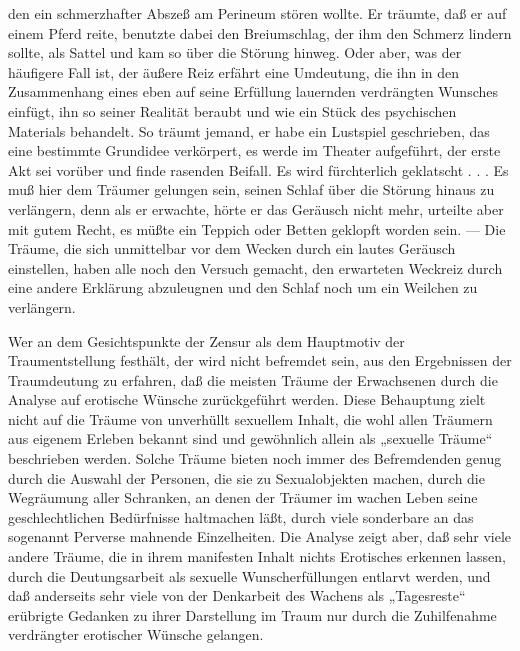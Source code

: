 \documentclass[twoside=true,titlepage=false,open=any, parskip=never, fontsize=10pt, headings=small, chapterprefix=false, appendixprefix=false]{scrbook}
\begin{document}
        \pstart
        den ein schmerzhafter Abszeß am Perineum stören wollte. Er träumte,
               daß er auf einem Pferd reite, benutzte dabei den Breiumschlag, der
               ihm den Schmerz lindern sollte, als Sattel und kam so über die Störung hinweg.
               Oder aber, was der häufigere Fall ist, der äußere Reiz erfährt eine Umdeutung,
               die ihn in den Zusammenhang eines eben auf seine Erfüllung lauernden
               verdrängten Wunsches einfügt, ihn so seiner Realität beraubt und wie ein Stück
               des psychischen Materials behandelt. So träumt jemand, er habe ein Lustspiel
               geschrieben, das eine bestimmte Grundidee verkörpert, es werde im Theater
               aufgeführt, der erste Akt sei vorüber und finde rasenden Beifall. Es wird
               fürchterlich geklatscht . . . Es muß hier dem Träumer gelungen sein, seinen
               Schlaf über die Störung hinaus zu verlängern, denn als er erwachte, hörte er das
               Geräusch nicht mehr, urteilte aber mit gutem Recht, es müßte ein Teppich oder
               Betten geklopft worden sein. — Die Träume, die sich unmittelbar vor dem
               Wecken durch ein lautes Geräusch einstellen, haben alle noch den Versuch
               gemacht, den erwarteten Weckreiz durch eine andere Erklärung abzuleugnen und den
               Schlaf noch um ein Weilchen zu verlängern.
        \pend
    
         
            
            
            \pend
            
        \pstart
        Wer an dem Gesichtspunkte der Zensur als dem Hauptmotiv der Traumentstellung festhält, der wird nicht befremdet
               sein, aus den Ergebnissen der Traumdeutung zu erfahren, daß die meisten Träume
               der Erwachsenen durch die Analyse auf
               erotische Wünsche zurückgeführt werden. Diese
               Behauptung zielt nicht auf die Träume von unverhüllt sexuellem Inhalt, die
               wohl allen Träumern aus eigenem Erleben bekannt sind und gewöhnlich allein als
               „sexuelle Träume“ beschrieben werden. Solche Träume bieten noch immer des
               Befremdenden genug durch die Auswahl der Personen, die sie zu
               Sexualobjekten machen, durch die Wegräumung aller Schranken, an denen der
               Träumer im wachen Leben seine geschlechtlichen Bedürfnisse haltmachen läßt,
               durch viele sonderbare an das sogenannt
               Perverse mahnende Einzelheiten. Die Analyse zeigt
               aber, daß sehr viele andere Träume, die in ihrem manifesten Inhalt nichts
               Erotisches erkennen lassen, durch die Deutungsarbeit als sexuelle
               Wunscherfüllungen entlarvt werden, und daß anderseits sehr viele von der
               Denkarbeit des Wachens als „Tagesreste“ erübrigte Gedanken zu ihrer
               Darstellung im Traum nur durch die Zuhilfenahme verdrängter
               erotischer Wünsche gelangen.
        \pend
    
\end{document}
